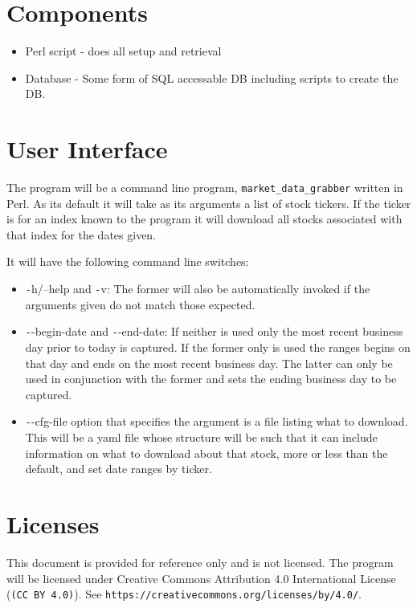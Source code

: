 \documentclass{report}
\begin{document}
\section{Components}

\begin{itemize}
    \item Perl script - does all setup and retrieval
    \item Database - Some form of SQL accessable DB including scripts to create
          the DB.
\end{itemize}

\section{User Interface}

The program will be a command line program, \texttt{market\_data\_grabber} written in
Perl.  As its default it will take as its arguments a list of stock tickers.  If the
ticker is for an index known to the program it will download all stocks associated
with that index for the dates given.

It will have the following command line switches:
\begin{itemize}
    \item {\texttt -h/--help} and {\texttt -v}: The former will also be automatically
        invoked if the arguments given do not match those expected.

    \item {\texttt --begin-date} and {\texttt --end-date}: If neither is used only 
        the most recent business day prior to today is captured.  If the former only
        is used the ranges begins on that day and ends on the most recent business
        day.  The latter can only be used in conjunction with the former and sets 
        the ending business day to be captured.

    \item {\texttt --cfg-file} option that specifies the argument is a file listing 
        what to download.  This will be a yaml file whose structure will be such that
        it can include information on what to download about that stock, more or less
        than the default, and set date ranges by ticker.
\end{itemize}

\section{Licenses}

This document is provided for reference only and is not licensed.  The program will
be licensed under Creative Commons Attribution 4.0 International License 
(\texttt{(CC BY 4.0)}).  See \texttt{https://creativecommons.org/licenses/by/4.0/}.
\end{document}

